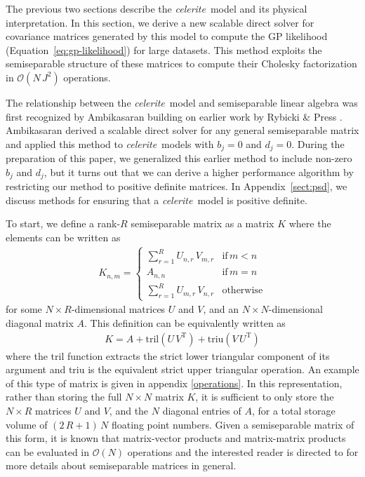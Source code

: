 \documentclass[manuscript, letterpaper]{aastex6}
\newcommand{\celeriteterm}{\emph{celerite}}
\renewcommand{\eqref}[1]{\ref{eq:#1}}
\newcommand{\eqalt}[1]{Equation~\eqref{#1}}
\newcommand{\eqlabel}[1]{\label{eq:#1}}
\newcommand{\sectref}[1]{\ref{sect:#1}}
\newcommand{\App}[1]{Appendix~\sectref{#1}}
\newcommand{\app}[1]{\App{#1}}
\newcommand{\T}{\ensuremath{\mathrm{T}}}
\begin{document}
The previous two sections describe the \celeriteterm\ model and its physical
interpretation.
In this section, we derive a new scalable direct solver for covariance
matrices generated by this model to compute the GP likelihood
(\eqalt{gp-likelihood}) for large datasets.
This method exploits the semiseparable structure of these matrices to compute
their Cholesky factorization in $\mathcal{O}(N\,J^2)$ operations.

The relationship between the \celeriteterm\ model and semiseparable linear
algebra was first recognized by Ambikasaran \citep{Ambikasaran:2015} building
on earlier work by Rybicki \& Press \citep{Rybicki:1995}.
Ambikasaran derived a scalable direct solver for any general semiseparable
matrix and applied this method to \celeriteterm\ models with $b_j = 0$ and
$d_j = 0$.
During the preparation of this paper, we generalized this earlier method to
include non-zero $b_j$ and $d_j$, but it turns out that we can derive a higher
performance algorithm by restricting our method to positive definite matrices.
In \app{psd}, we discuss methods for ensuring that a \celeriteterm\ model is
positive definite.

To start, we define a rank-$R$ semiseparable matrix as a matrix $K$ where the
elements can be written as
\begin{eqnarray}
K_{n,m} = \left\{\begin{array}{ll}
    \sum_{r=1}^R U_{n,r}\,V_{m,r} & \mathrm{if}\,m<n \\
    A_{n,n} & \mathrm{if}\,m=n \\
    \sum_{r=1}^R U_{m,r}\,V_{n,r} & \mathrm{otherwise}
\end{array}\right.
\end{eqnarray}
for some $N \times R$-dimensional matrices $U$ and $V$, and an $N \times
N$-dimensional diagonal matrix $A$.
This definition can be equivalently written as
\begin{eqnarray}\eqlabel{semi-sep}
K = A + \mathrm{tril}(U\,V^\T) + \mathrm{triu}(V\,U^\T)
\end{eqnarray}
where the $\mathrm{tril}$ function extracts the strict lower triangular
component of its argument and $\mathrm{triu}$ is the equivalent strict upper
triangular operation.  An example of this type of matrix is given in appendix \ref{operations}.
In this representation, rather than storing the full $N \times N$ matrix $K$,
it is sufficient to only store the $N \times R$ matrices $U$ and $V$, and the
$N$ diagonal entries of $A$, for a total storage volume of $(2\,R+1)\,N$
floating point numbers.
Given a semiseparable matrix of this form, it is known that matrix-vector
products and matrix-matrix products can be evaluated in $\mathcal{O}(N)$
operations and the interested reader is directed to \citet{Vandebril:2007} for
more details about semiseparable matrices in general.
\end{document}
